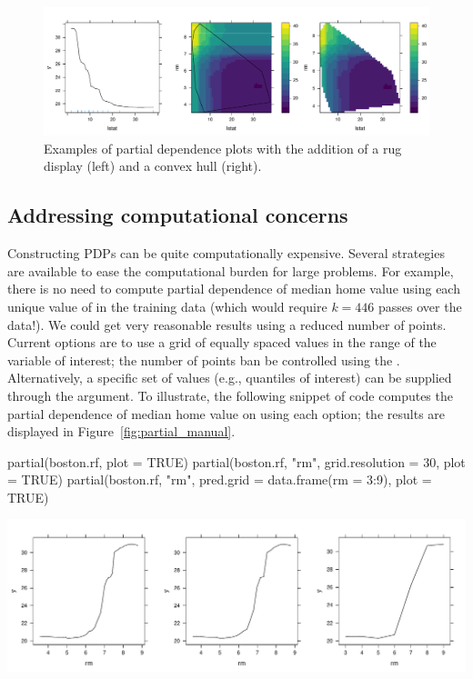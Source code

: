 \begin{figure}[htbp]
  \centering
  \includegraphics[width=1.0\linewidth]{partial_extrap}
  \caption{Examples of partial dependence plots with the addition of a rug display (left) and a convex hull (right).}
  \label{fig:partial_extrap}
\end{figure}

\subsection{Addressing computational concerns}

Constructing PDPs can be quite computationally expensive. Several strategies are available to ease the computational burden for large problems. For example, there is no need to compute partial dependence of median home value using each unique value of  in the training data (which would require $k = 446$ passes over the data!). We could get very reasonable results using a reduced number of points. Current options are to use a grid of equally spaced values in the range of the variable of interest; the number of points ban be controlled using the . Alternatively, a specific set of values (e.g., quantiles of interest) can be supplied through the  argument. To illustrate, the following snippet of code computes the partial dependence of median home value on  using each option; the results are displayed in Figure~\ref{fig:partial_manual}.
\begin{example}
partial(boston.rf, plot = TRUE)
partial(boston.rf, "rm", grid.resolution = 30, plot = TRUE)
partial(boston.rf, "rm", pred.grid = data.frame(rm = 3:9), plot = TRUE)
\end{example}

\begin{widefigure}[htbp]
  \centering
  \includegraphics[width=0.8\linewidth]{partial_manual}
  \caption{Partial dependence of  on . \textit{Left}: Default plot. \textit{Middle}: Using a reduced grid size. \textit{Right}: Using a user-specified grid.}
  \label{fig:partial_manual}
\end{widefigure}

